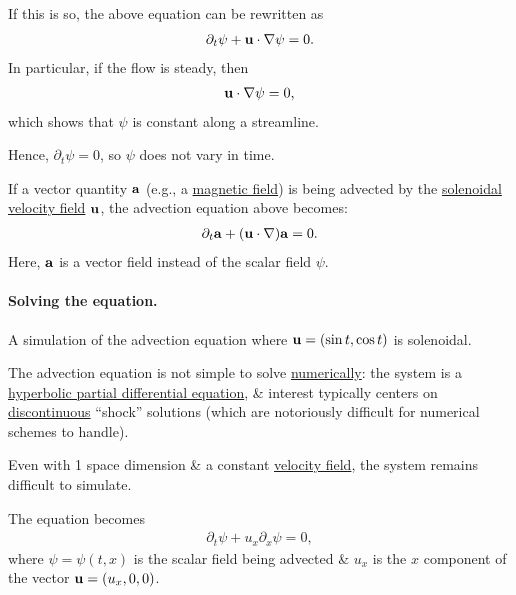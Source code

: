 \documentclass{article}
\begin{document}
If this is so, the above equation can be rewritten as
\begin{align*}
	\partial_t\psi + {\bf u}\cdot\nabla\psi = 0.
\end{align*}
In particular, if the flow is steady, then
\begin{align*}
	{\bf u}\cdot\nabla\psi = 0,
\end{align*}
which shows that $\psi$ is constant along a streamline.

Hence, $\partial_t\psi = 0$, so $\psi$ does not vary in time.

%
If a vector quantity ${\bf a}$ (e.g., a \href{https://en.wikipedia.org/wiki/Magnetic_field}{magnetic field}) is being advected by the \href{https://en.wikipedia.org/wiki/Solenoidal}{solenoidal} \href{https://en.wikipedia.org/wiki/Velocity_field}{velocity field} ${\bf u}$, the advection equation above becomes: 
\begin{align*}
	\partial_t{\bf a} + ({\bf u}\cdot\nabla){\bf a} = 0.
\end{align*}
Here, ${\bf a}$ is a vector field instead of the scalar field $\psi$.

\paragraph{Solving the equation.} {\sf A simulation of the advection equation where ${\bf u} = (\sin t,\cos t)$ is solenoidal.}

%
The advection equation is not simple to solve \href{https://en.wikipedia.org/wiki/Numerical_analysis}{numerically}: the system is a \href{https://en.wikipedia.org/wiki/Hyperbolic_partial_differential_equation}{hyperbolic partial differential equation}, \& interest typically centers on \href{https://en.wikipedia.org/wiki/Continuous_function}{discontinuous} ``shock'' solutions (which are notoriously difficult for numerical schemes to handle).

%
Even with 1 space dimension \& a constant \href{https://en.wikipedia.org/wiki/Velocity_field}{velocity field}, the system remains difficult to simulate.

The equation becomes
\begin{align*}
	\partial_t\psi + u_x\partial_x\psi = 0,
\end{align*}
where $\psi = \psi(t,x)$ is the scalar field being advected \& $u_x$ is the $x$ component of the vector ${\bf u} = (u_x,0,0)$.
\end{document}
